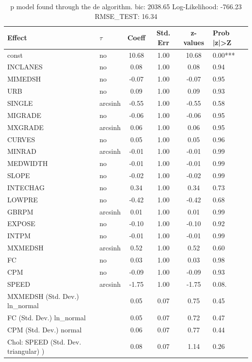 \begin{table}
	\caption{p model found through the de algorithm. bic: 2038.65 Log-Likelihood: -766.23 RMSE_TEST: 16.34}
	\begin{center}
		\begin{tabular}{|l|l|c|c|c|l|}
			\hline
			Effect & $\tau$ & Coeff & Std. Err & z-values & Prob |z|>Z \\
			\hline
			const & no & 10.68 & 1.00 & 10.68 & 0.00*** \\
			\hline
			INCLANES & no & 0.08 & 1.00 & 0.08 & 0.94 \\
			\hline
			MIMEDSH & no & -0.07 & 1.00 & -0.07 & 0.95 \\
			\hline
			URB & no & 0.09 & 1.00 & 0.09 & 0.93 \\
			\hline
			SINGLE & arcsinh & -0.55 & 1.00 & -0.55 & 0.58 \\
			\hline
			MIGRADE & no & -0.06 & 1.00 & -0.06 & 0.95 \\
			\hline
			MXGRADE & arcsinh & 0.06 & 1.00 & 0.06 & 0.95 \\
			\hline
			CURVES & no & 0.05 & 1.00 & 0.05 & 0.96 \\
			\hline
			MINRAD & arcsinh & -0.01 & 1.00 & -0.01 & 0.99 \\
			\hline
			MEDWIDTH & no & -0.01 & 1.00 & -0.01 & 0.99 \\
			\hline
			SLOPE & no & -0.02 & 1.00 & -0.02 & 0.99 \\
			\hline
			INTECHAG & no & 0.34 & 1.00 & 0.34 & 0.73 \\
			\hline
			LOWPRE & no & -0.42 & 1.00 & -0.42 & 0.68 \\
			\hline
			GBRPM & arcsinh & 0.01 & 1.00 & 0.01 & 0.99 \\
			\hline
			EXPOSE & no & -0.10 & 1.00 & -0.10 & 0.92 \\
			\hline
			INTPM & no & -0.01 & 1.00 & -0.01 & 0.99 \\
			\hline
			MXMEDSH & arcsinh & 0.52 & 1.00 & 0.52 & 0.60 \\
			\hline
			FC & no & 0.03 & 1.00 & 0.03 & 0.98 \\
			\hline
			CPM & no & -0.09 & 1.00 & -0.09 & 0.93 \\
			\hline
			SPEED & arcsinh & -1.75 & 1.00 & -1.75 & 0.08. \\
			\hline
			MXMEDSH (Std. Dev.) ln_normal &  & 0.05 & 0.07 & 0.75 & 0.45 \\
			\hline
			FC (Std. Dev.) ln_normal &  & 0.05 & 0.07 & 0.72 & 0.47 \\
			\hline
			CPM (Std. Dev.) normal &  & 0.06 & 0.07 & 0.77 & 0.44 \\
			\hline
			 Chol: SPEED (Std. Dev. triangular) ) &  & 0.08 & 0.07 & 1.14 & 0.26 \\
			\hline
		\end{tabular}
	\end{center}
\end{table}